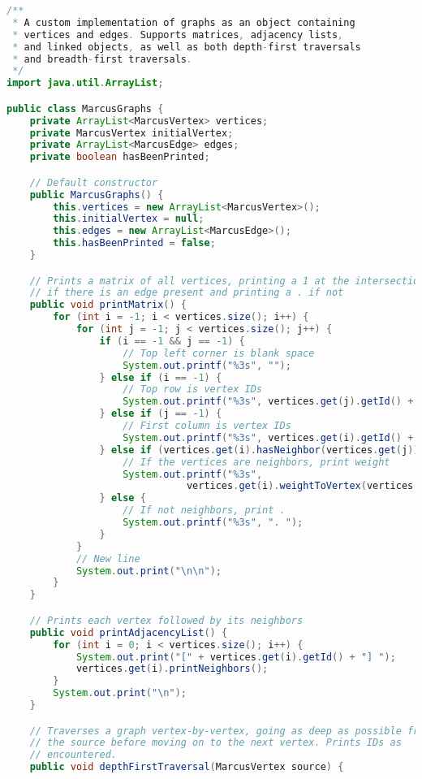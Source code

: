 \documentclass[letterpaper, 10pt]{article}
\begin{document}
\begin{lstlisting}[language=Java, firstnumber=1]
/**
 * A custom implementation of graphs as an object containing
 * vertices and edges. Supports matrices, adjacency lists,
 * and linked objects, as well as both depth-first traversals
 * and breadth-first traversals.
 */
import java.util.ArrayList;

public class MarcusGraphs {
    private ArrayList<MarcusVertex> vertices;
    private MarcusVertex initialVertex;
    private ArrayList<MarcusEdge> edges;
    private boolean hasBeenPrinted;

    // Default constructor
    public MarcusGraphs() {
        this.vertices = new ArrayList<MarcusVertex>();
        this.initialVertex = null;
        this.edges = new ArrayList<MarcusEdge>();
        this.hasBeenPrinted = false;
    }

    // Prints a matrix of all vertices, printing a 1 at the intersection
    // if there is an edge present and printing a . if not
    public void printMatrix() {
        for (int i = -1; i < vertices.size(); i++) {
            for (int j = -1; j < vertices.size(); j++) {
                if (i == -1 && j == -1) {
                    // Top left corner is blank space
                    System.out.printf("%3s", "");
                } else if (i == -1) {
                    // Top row is vertex IDs
                    System.out.printf("%3s", vertices.get(j).getId() + " ");
                } else if (j == -1) {
                    // First column is vertex IDs
                    System.out.printf("%3s", vertices.get(i).getId() + " ");
                } else if (vertices.get(i).hasNeighbor(vertices.get(j))) {
                    // If the vertices are neighbors, print weight
                    System.out.printf("%3s",
                               vertices.get(i).weightToVertex(vertices.get(j)));
                } else {
                    // If not neighbors, print .
                    System.out.printf("%3s", ". ");
                }
            }
            // New line
            System.out.print("\n\n");
        }
    }

    // Prints each vertex followed by its neighbors
    public void printAdjacencyList() {
        for (int i = 0; i < vertices.size(); i++) {
            System.out.print("[" + vertices.get(i).getId() + "] ");
            vertices.get(i).printNeighbors();
        }
        System.out.print("\n");
    }

    // Traverses a graph vertex-by-vertex, going as deep as possible from
    // the source before moving on to the next vertex. Prints IDs as
    // encountered.
    public void depthFirstTraversal(MarcusVertex source) {


\end{lstlisting}
\end{document}
